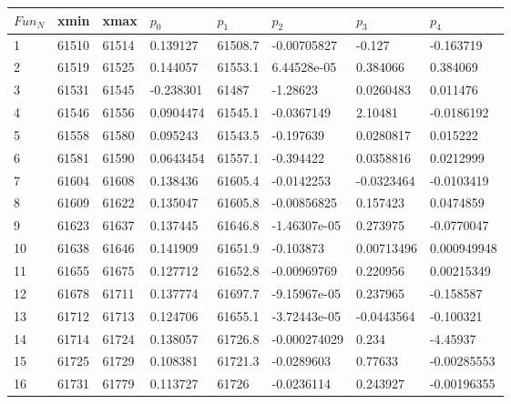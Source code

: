 \begin{itemize}
\begin {table}[!h]
\begin{center}
\begin{tabular}{|l|l|l|l|l|l|l|l|}
\hline
$Fun_{N}$ & xmin  &   xmax    &  $p_{0}$     &   $p_{1}$    &  $p_{2}$      &   $p_{3}$  &   $p_{4}$\\
\hline
1   &  61510   &61514   &   0.139127   &  61508.7   &   -0.00705827      & -0.127   &   -0.163719\\
\hline
2   &  61519   &  61525  &    0.144057  &   61553.1  &    6.44528e-05   &    0.384066 &     0.384069\\
\hline
3   &  61531   &  61545   &   -0.238301    & 61487    &  -1.28623      & 0.0260483   &   0.011476\\
\hline
4   &  61546    & 61556    &  0.0904474   &  61545.1   &   -0.0367149 &      2.10481  &    -0.0186192\\
\hline
5   &  61558  &   61580     & 0.095243   &  61543.5  &    -0.197639  &     0.0280817  &    0.015222\\
\hline
6   &  61581   &  61590 & 0.0643454     &61557.1    &  -0.394422    &   0.0358816   &   0.0212999\\
\hline
7   &  61604    & 61608  &    0.138436 &    61605.4  &    -0.0142253    &   -0.0323464  &    -0.0103419\\
\hline
8  &   61609    & 61622   &   0.135047    & 61605.8   &   -0.00856825    &   0.157423    &  0.0474859\\
\hline
9   &  61623    & 61637    &  0.137445   &  61646.8    &  -1.46307e-05  &     0.273975  &    -0.0770047\\
\hline
10 &    61638    & 61646    &  0.141909 &    61651.9 &     -0.103873    &   0.00713496   &  0.000949948\\
\hline
11&   61655  & 61675  & 0.127712   &  61652.8   &  -0.00969769     &  0.220956  &    0.00215349\\
\hline
12 &  61678   &  61711 &     0.137774     &61697.7  &    -9.15967e-05    &   0.237965 &     -0.158587\\
\hline
13  & 61712   & 61713   &   0.124706     &61655.1    &  -3.72443e-05    &   -0.0443564 &     -0.100321\\
\hline
14    & 61714  &   61724 &     0.138057 &    61726.8  &    -0.000274029   &    0.234    &  -4.45937\\
\hline
15   &  61725  &   61729  &    0.108381    & 61721.3   &   -0.0289603    &   0.77633  &    -0.00285553\\
\hline
16  &   61731  &   61779   &   0.113727   &  61726   &   -0.0236114     &  0.243927    &  -0.00196355\\

\end{tabular}
\end{center}
\end{table}
\end{itemize}
